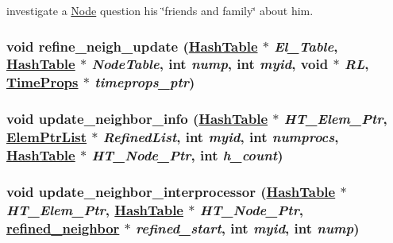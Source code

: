 investigate a \hyperlink{classNode}{Node} question his \char`\"{}friends and family\char`\"{} about him. 

\hypertarget{updatenei_8C_a10}{
\subsubsection[refine\_\-neigh\_\-update]{\setlength{\rightskip}{0pt plus 5cm}void refine\_\-neigh\_\-update (\hyperlink{classHashTable}{Hash\-Table} $\ast$ {\em El\_\-Table}, \hyperlink{classHashTable}{Hash\-Table} $\ast$ {\em Node\-Table}, int {\em nump}, int {\em myid}, void $\ast$ {\em RL}, \hyperlink{structTimeProps}{Time\-Props} $\ast$ {\em timeprops\_\-ptr})}}
\label{updatenei_8C_a10}


\hypertarget{updatenei_8C_a9}{
\subsubsection[update\_\-neighbor\_\-info]{\setlength{\rightskip}{0pt plus 5cm}void update\_\-neighbor\_\-info (\hyperlink{classHashTable}{Hash\-Table} $\ast$ {\em HT\_\-Elem\_\-Ptr}, \hyperlink{classElemPtrList}{Elem\-Ptr\-List} $\ast$ {\em Refined\-List}, int {\em myid}, int {\em numprocs}, \hyperlink{classHashTable}{Hash\-Table} $\ast$ {\em HT\_\-Node\_\-Ptr}, int {\em h\_\-count})}}
\label{updatenei_8C_a9}


\hypertarget{updatenei_8C_a11}{
\subsubsection[update\_\-neighbor\_\-interprocessor]{\setlength{\rightskip}{0pt plus 5cm}void update\_\-neighbor\_\-interprocessor (\hyperlink{classHashTable}{Hash\-Table} $\ast$ {\em HT\_\-Elem\_\-Ptr}, \hyperlink{classHashTable}{Hash\-Table} $\ast$ {\em HT\_\-Node\_\-Ptr}, \hyperlink{structrefined__neighbor}{refined\_\-neighbor} $\ast$ {\em refined\_\-start}, int {\em myid}, int {\em nump})}}
\label{updatenei_8C_a11}


